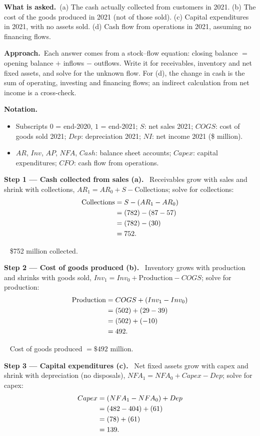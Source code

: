 \documentclass[11pt,a4paper]{article}
\newcommand{\notation}{\par\noindent\textbf{Notation.}}
\newcommand{\step}[2]{\par\medskip\noindent\textbf{Step #1 --- #2.}~}
\newcommand{\asked}{\par\medskip\noindent\textbf{What is asked.}~}
\newcommand{\approach}{\par\smallskip\noindent\textbf{Approach.}~}
\newcommand{\answer}[1]{\par\smallskip\noindent\fbox{\textbf{Answer #1.}}~}
\begin{document}
\asked (a) The cash actually collected from customers in 2021. (b) The cost of the goods produced
in 2021 (not of those sold). (c) Capital expenditures in 2021, with no assets sold. (d) Cash flow
from operations in 2021, assuming no financing flows.

\approach Each answer comes from a stock--flow equation: closing balance $=$ opening balance
$+$ inflows $-$ outflows. Write it for receivables, inventory and net fixed assets, and solve for
the unknown flow. For (d), the change in cash is the sum of operating, investing and financing
flows; an indirect calculation from net income is a cross-check.

\notation
\begin{itemize}
  \item Subscripts $0$ = end-2020, $1$ = end-2021; $S$: net sales 2021; $COGS$: cost of goods sold
        2021; $Dep$: depreciation 2021; $NI$: net income 2021 (\$ million).
  \item $AR$, $Inv$, $AP$, $NFA$, $Cash$: balance sheet accounts; $Capex$: capital expenditures;
        $CFO$: cash flow from operations.
\end{itemize}

\step{1}{Cash collected from sales (a)}
Receivables grow with sales and shrink with collections, $AR_1 = AR_0 + S - \text{Collections}$;
solve for collections:
\begin{align}
  \text{Collections} &= S - (AR_1 - AR_0) \notag\\
  &= (782) - (87 - 57) \notag\\
  &= (782) - (30) \notag\\
  &= 752. \notag
\end{align}

\answer{(a)} \$752 million collected.

\step{2}{Cost of goods produced (b)}
Inventory grows with production and shrinks with goods sold, $Inv_1 = Inv_0 + \text{Production} -
COGS$; solve for production:
\begin{align}
  \text{Production} &= COGS + (Inv_1 - Inv_0) \notag\\
  &= (502) + (29 - 39) \notag\\
  &= (502) + (-10) \notag\\
  &= 492. \notag
\end{align}

\answer{(b)} Cost of goods produced $= \$492$ million.

\step{3}{Capital expenditures (c)}
Net fixed assets grow with capex and shrink with depreciation (no disposals),
$NFA_1 = NFA_0 + Capex - Dep$; solve for capex:
\begin{align}
  Capex &= (NFA_1 - NFA_0) + Dep \notag\\
  &= (482 - 404) + (61) \notag\\
  &= (78) + (61) \notag\\
  &= 139. \label{e10-capex}
\end{align}
\end{document}
